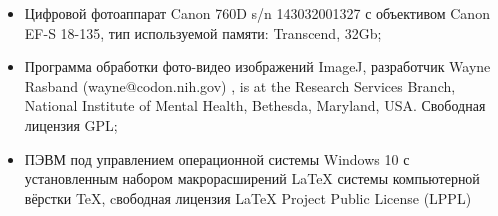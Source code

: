 \begin{itemize}
\item 	
Цифровой фотоаппарат Canon 760D s/n 143032001327 с объективом Canon EF-S 18-135, тип используемой памяти: Transcend,  32Gb;


%	
\item 
 Программа обработки фото-видео изображений ImageJ, разработчик  Wayne Rasband (wayne@codon.nih.gov) , is at the Research Services Branch, National Institute of Mental Health, Bethesda, Maryland, USA. Свободная лицензия GPL;
\item  
ПЭВМ под управлением операционной системы Windows 10 с установленным набором макрорасширений LaTeX системы компьютерной вёрстки TeX, cвободная лицензия LaTeX Project Public License (LPPL)
\end{itemize}
